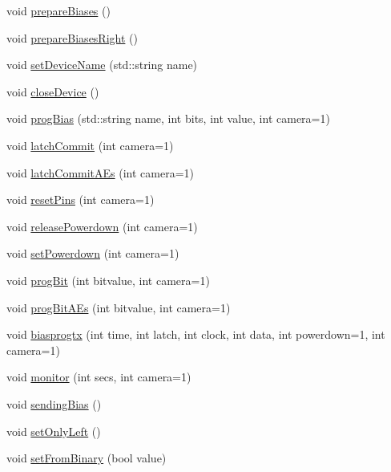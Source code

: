 \begin{DoxyCompactItemize}
\item 
void \hyperlink{classdevice2yarp_afbcd3cc36aeda39c389037ff480a0c3a}{prepare\-Biases} ()
\item 
void \hyperlink{classdevice2yarp_ab103ad6beed47415371ec71cc2ac30c3}{prepare\-Biases\-Right} ()
\item 
void \hyperlink{classdevice2yarp_aaaff6edb1a3d7830d6e87b14226e9207}{set\-Device\-Name} (std\-::string name)
\item 
void \hyperlink{classdevice2yarp_af60c47d12785c8bbc8ffb0a29f740a97}{close\-Device} ()
\item 
void \hyperlink{classdevice2yarp_a2ad1d6367e70bbc19d163b80a959843b}{prog\-Bias} (std\-::string name, int bits, int value, int camera=1)
\item 
void \hyperlink{classdevice2yarp_a148575c0588c481968e8e1c89aa1b2d8}{latch\-Commit} (int camera=1)
\item 
void \hyperlink{classdevice2yarp_ad5db8d09f97eb010e8037de3aafe4c0c}{latch\-Commit\-A\-Es} (int camera=1)
\item 
void \hyperlink{classdevice2yarp_a5227cd9f8f77fc3282abdb4f067c72db}{reset\-Pins} (int camera=1)
\item 
void \hyperlink{classdevice2yarp_acd91e6286807878481a293929579a358}{release\-Powerdown} (int camera=1)
\item 
void \hyperlink{classdevice2yarp_a468ec9658d04b2c89ea383a398245279}{set\-Powerdown} (int camera=1)
\item 
void \hyperlink{classdevice2yarp_a65726cde64ea739945753f5b51e84d8b}{prog\-Bit} (int bitvalue, int camera=1)
\item 
void \hyperlink{classdevice2yarp_a5291edc3d845bc6dd35c6d1a783ea80c}{prog\-Bit\-A\-Es} (int bitvalue, int camera=1)
\item 
void \hyperlink{classdevice2yarp_a39c03e4a4e0ac4b891947b872974f8af}{biasprogtx} (int time, int latch, int clock, int data, int powerdown=1, int camera=1)
\item 
void \hyperlink{classdevice2yarp_a19c60dd42e00da0e717da9fe17a5b2f5}{monitor} (int secs, int camera=1)
\item 
void \hyperlink{classdevice2yarp_a300aab882d64fa1a51b2058b530c8093}{sending\-Bias} ()
\item 
void \hyperlink{classdevice2yarp_a704565be367fa28840df912a97bdc25a}{set\-Only\-Left} ()
\item 
void \hyperlink{classdevice2yarp_a94653e9e8ce5ac4a60ae920f0ee41ee6}{set\-From\-Binary} (bool value)
\item 

\end{DoxyCompactItemize}
